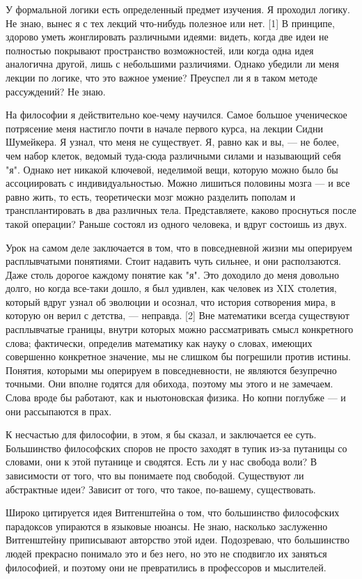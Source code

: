 \documentclass[ebook,12pt,oneside,openany]{memoir}
\begin{document}
У формальной логики есть определенный предмет изучения. Я проходил
логику. Не знаю, вынес я с тех лекций что-нибудь полезное или нет. [1]
В принципе, здорово уметь жонглировать различными идеями: видеть,
когда две идеи не полностью покрывают пространство возможностей, или
когда одна идея аналогична другой, лишь с небольшими различиями.
Однако убедили ли меня лекции по логике, что это важное умение?
Преуспел ли я в таком методе рассуждений? Не знаю.

На философии я действительно кое-чему научился. Самое большое
ученическое потрясение меня настигло почти в начале первого курса, на
лекции Сидни Шумейкера. Я узнал, что меня не существует. Я, равно как
и вы, — не более, чем набор клеток, ведомый туда-сюда различными
силами и называющий себя "я". Однако нет никакой ключевой, неделимой
вещи, которую можно было бы ассоциировать с индивидуальностью. Можно
лишиться половины мозга — и все равно жить, то есть, теоретически мозг
можно разделить пополам и трансплантировать в два различных тела.
Представляете, каково проснуться после такой операции? Раньше состоял
из одного человека, и вдруг состоишь из двух.

Урок на самом деле заключается в том, что в повседневной жизни мы
оперируем расплывчатыми понятиями. Стоит надавить чуть сильнее, и они
расползаются. Даже столь дорогое каждому понятие как "я". Это доходило
до меня довольно долго, но когда все-таки дошло, я был удивлен, как
человек из XIX столетия, который вдруг узнал об эволюции и осознал,
что история сотворения мира, в которую он верил с детства, — неправда.
[2] Вне математики всегда существуют расплывчатые границы, внутри
которых можно рассматривать смысл конкретного слова; фактически,
определив математику как науку о словах, имеющих совершенно конкретное
значение, мы не слишком бы погрешили против истины. Понятия, которыми
мы оперируем в повседневности, не являются безупречно точными. Они
вполне годятся для обихода, поэтому мы этого и не замечаем. Слова
вроде бы работают, как и ньютоновская физика. Но копни поглубже — и
они рассыпаются в прах.

К несчастью для философии, в этом, я бы сказал, и заключается ее суть.
Большинство философских споров не просто заходят в тупик из-за
путаницы со словами, они к этой путанице и сводятся. Есть ли у нас
свобода воли? В зависимости от того, что вы понимаете под свободой.
Существуют ли абстрактные идеи? Зависит от того, что такое, по-вашему,
существовать.

Широко цитируется идея Витгенштейна о том, что большинство философских
парадоксов упираются в языковые нюансы. Не знаю, насколько заслуженно
Витгенштейну приписывают авторство этой идеи. Подозреваю, что
большинство людей прекрасно понимало это и без него, но это не
сподвигло их заняться философией, и поэтому они не превратились в
профессоров и мыслителей.
\end{document}
